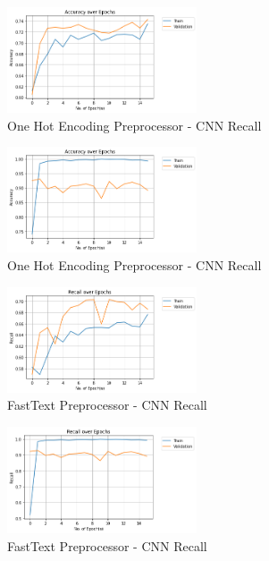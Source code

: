 \documentclass[12pt]{report}
\begin{document}
\begin{figure}[h!]
	\centering
	\includegraphics[width=0.5\textwidth]{accuracy-1.png}
	\caption{One Hot Encoding Preprocessor - CNN Recall}
	\label{fig:ohep-acc}
\end{figure}

\begin{figure}[h!]
	\centering
	\includegraphics[width=0.5\textwidth]{accuracy.png}
	\caption{One Hot Encoding Preprocessor - CNN Recall}
	\label{fig:ohep-rec}
\end{figure}


\begin{figure}[h!]
	\centering
	\includegraphics[width=0.5\textwidth]{recall-1.png}
	\caption{FastText Preprocessor - CNN Recall}
	\label{fig:ft-rec}
\end{figure}

\begin{figure}[h!]
	\centering
	\includegraphics[width=0.5\textwidth]{recall.png}
	\caption{FastText Preprocessor - CNN Recall}
	\label{fig:ft-acc}
\end{figure}
\end{document}
